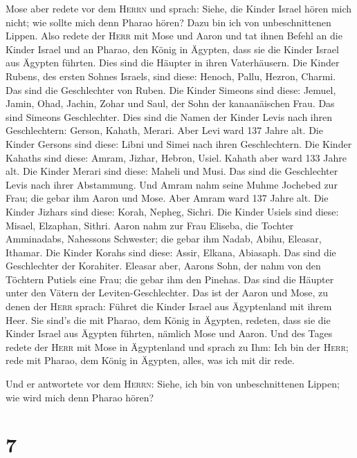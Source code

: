  Mose aber redete vor dem \textsc{Herrn} und sprach:
Siehe, die Kinder Israel hören mich nicht; wie sollte mich denn Pharao
hören? Dazu bin ich von unbeschnittenen Lippen.  Also
redete der \textsc{Herr} mit Mose und Aaron und tat ihnen Befehl an die
Kinder Israel und an Pharao, den König in Ägypten, dass sie die Kinder
Israel aus Ägypten führten.  Dies sind die Häupter in
ihren Vaterhäusern. Die Kinder Rubens, des ersten Sohnes Israels, sind
diese: Henoch, Pallu, Hezron, Charmi. Das sind die Geschlechter von
Ruben.  Die Kinder Simeons sind diese: Jemuel, Jamin,
Ohad, Jachin, Zohar und Saul, der Sohn der kanaanäischen Frau. Das sind
Simeons Geschlechter.  Dies sind die Namen der Kinder
Levis nach ihren Geschlechtern: Gerson, Kahath, Merari. Aber Levi ward
137 Jahre alt.  Die Kinder Gersons sind diese: Libni und
Simei nach ihren Geschlechtern.  Die Kinder Kahaths sind
diese: Amram, Jizhar, Hebron, Usiel. Kahath aber ward 133 Jahre alt.
 Die Kinder Merari sind diese: Maheli und Musi. Das sind
die Geschlechter Levis nach ihrer Abstammung.  Und Amram
nahm seine Muhme Jochebed zur Frau; die gebar ihm Aaron und Mose. Aber
Amram ward 137 Jahre alt.  Die Kinder Jizhars sind diese:
Korah, Nepheg, Sichri.  Die Kinder Usiels sind diese:
Misael, Elzaphan, Sithri.  Aaron nahm zur Frau Eliseba,
die Tochter Amminadabs, Nahessons Schwester; die gebar ihm Nadab, Abihu,
Eleasar, Ithamar.  Die Kinder Korahs sind diese: Assir,
Elkana, Abiasaph. Das sind die Geschlechter der Korahiter.
 Eleasar aber, Aarons Sohn, der nahm von den Töchtern
Putiels eine Frau; die gebar ihm den Pinehas. Das sind die Häupter unter
den Vätern der Leviten-Geschlechter.  Das ist der Aaron
und Mose, zu denen der \textsc{Herr} sprach: Führet die Kinder Israel
aus Ägyptenland mit ihrem Heer.  Sie sind's die mit
Pharao, dem König in Ägypten, redeten, dass sie die Kinder Israel aus
Ägypten führten, nämlich Mose und Aaron.  Und des Tages
redete der \textsc{Herr} mit Mose in Ägyptenland  und
sprach zu Ihm: Ich bin der \textsc{Herr}; rede mit Pharao, dem König in
Ägypten, alles, was ich mit dir rede.

 Und er antwortete vor dem \textsc{Herrn}: Siehe, ich bin
von unbeschnittenen Lippen; wie wird mich denn Pharao hören?

\hypertarget{section-6}{%
\section{7}\label{section-6}}

